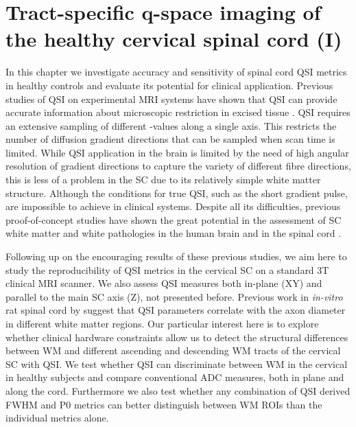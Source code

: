 \chapter{Tract-specific q-space imaging of the healthy cervical spinal cord (I)}
\label{chapter5}
\glsresetall %
In this chapter we investigate accuracy and sensitivity of spinal cord \gls{QSI} metrics in healthy controls and evaluate its potential for clinical application. Previous studies of \gls{QSI} on experimental MRI systems have shown that \gls{QSI} can provide accurate information about microscopic restriction in excised tissue \citep{Assaf:2000,Bar-Shir:2008,Ong:2008}. \Gls{QSI} requires an extensive sampling of different {\q}-values along a single axis. This restricts the number of diffusion gradient directions that can be sampled when scan time is limited. While \gls{QSI} application in the brain is limited by the need of high angular resolution of gradient directions to capture the variety of different fibre directions, this is less of a problem in the \gls{SC} due to its relatively simple white matter structure. Although the conditions for true \gls{QSI}, such as the short gradient pulse, are impossible to achieve in clinical systems. Despite all its difficulties, previous proof-of-concept studies have shown the great potential in the assessment of {\gls{SC}} white matter and white pathologies in the human brain \citep{Assaf:2002,Yamada:2012} and in the spinal cord \citep{Farrell:2008}.

Following up on the encouraging results of these previous studies, we aim here to study the reproducibility of \gls{QSI} metrics in the cervical {\gls{SC}} on a standard 3T clinical MRI scanner. We also assess \gls{QSI} measures both in-plane (XY) and parallel to the main {\gls{SC}} axis (Z), not presented before. Previous work in \emph{in-vitro} rat spinal cord by \citet{Ong:2008,Ong:2010} suggest that \gls{QSI} parameters correlate with the axon diameter in different white matter regions. Our particular interest here is to explore whether clinical hardware constraints allow us to detect the structural differences between \gls{WM} and different ascending and descending \gls{WM} tracts of the cervical {\gls{SC}} with \gls{QSI}. We test whether \gls{QSI} can discriminate between \gls{WM} in the cervical in healthy subjects and compare conventional \gls{ADC} measures, both in plane and along the cord. Furthermore we also test whether any combination of \gls{QSI} derived FWHM and P0 metrics can better distinguish between WM \glspl{ROI} than the individual metrics alone.

